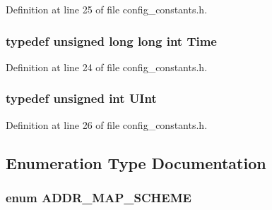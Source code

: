 Definition at line 25 of file config\_\-constants.h.
\subsubsection[{Time}]{\setlength{\rightskip}{0pt plus 5cm}typedef unsigned long long int {\bf Time}}\label{config__constants_8h_a475e5c84e5eb0fe317942dc62553f7e}




Definition at line 24 of file config\_\-constants.h.
\subsubsection[{UInt}]{\setlength{\rightskip}{0pt plus 5cm}typedef unsigned int {\bf UInt}}\label{config__constants_8h_ba0996d26f7be2572973245b51852757}




Definition at line 26 of file config\_\-constants.h.

\subsection{Enumeration Type Documentation}
\subsubsection[{ADDR\_\-MAP\_\-SCHEME}]{\setlength{\rightskip}{0pt plus 5cm}enum {\bf ADDR\_\-MAP\_\-SCHEME}}\label{config__constants_8h_5070e557d1fe0f8dfbfe47ffb8feb753}



